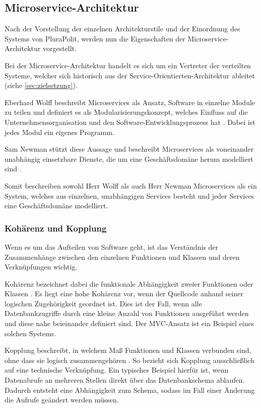 \subsection{Microservice-Architektur}
\label{sec:microservices}

Nach der Vorstellung der einzelnen Architekturstile und der Einordnung des Systems von PluraPolit, werden nun die Eigenschaften der Microservice-Architektur vorgestellt.

Bei der Microservice-Architektur handelt es sich um ein Vertreter der verteilten Systeme, welcher sich historisch aus der Service-Orientierten-Architektur ableitet (siehe \cref{sec:zielsetzung}).

Eberhard Wolff beschreibt Microservices als Ansatz, Software in einzelne Module zu teilen und definiert es als Modularisierungskonzept, welches Einfluss auf die Unternehmensorganisation und den Software-Entwicklungsprozess hat \parencite[vgl.][Kap. 1.1]{wolff_microservices_2018}. Dabei ist jedes Modul ein eigenes Programm.

Sam Newman stützt diese Aussage und beschreibt Microservices als voneinander unabhängig einsetzbare Dienste, die um eine Geschäftsdomäne herum modelliert sind \parencite[vgl.][Kap. 2.1]{newman_monolith_2019}.

Somit beschreiben sowohl Herr Wolff als auch Herr Newman Microservices als ein System, welches aus einzelnen, unabhängigen Services besteht und jeder Services eine Geschäftsdomäne modelliert.

\subsubsection{Kohärenz und Kopplung}

Wenn es um das Aufteilen von Software geht, ist das Verständnis der Zusammenhänge zwischen den einzelnen Funktionen und Klassen und deren Verknüpfungen wichtig.

Kohärenz bezeichnet dabei die funktionale Abhängigkeit zweier Funktionen oder Klassen \parencite[vgl.][Kap. 2.3.1]{newman_monolith_2019}. Es liegt eine hohe Kohärenz vor, wenn der Quellcode anhand seiner logischen Zugehörigkeit geordnet ist. Dies ist der Fall, wenn alle Datenbankzugriffe durch eine kleine Anzahl von Funktionen ausgeführt werden und diese nahe beieinander definiert sind. Der MVC-Ansatz ist ein Beispiel eines solchen Systems.

Kopplung beschreibt, in welchem Maß Funktionen und Klassen verbunden sind, ohne dass sie logisch zusammengehören \parencite[vgl.][Kap. 2.3.2]{newman_monolith_2019}. So bezieht sich Kopplung ausschließlich auf eine technische Verknüpfung. Ein typisches Beispiel hierfür ist, wenn Datenabrufe an mehreren Stellen direkt über das Datenbankschema ablaufen. Dadurch entsteht eine Abhängigkeit zum Schema, sodass im Fall einer Änderung die Aufrufe geändert werden müssen.

